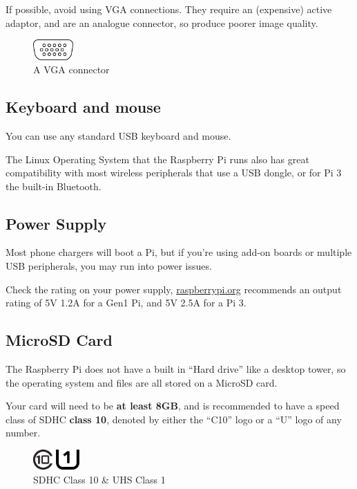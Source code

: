 		If possible, avoid using VGA connections. They require an (expensive) active adaptor, and are an analogue connector, so produce poorer image quality.
		
		\begin{figure}[h]
			\centering
			\includegraphics[height=22pt]{000_IntroToPi/1_EquipmentNeeded/VGA}
			\\A VGA connector
		\end{figure}

	\subsection*{Keyboard and mouse}
	
		You can use any standard USB keyboard and mouse.
		
		The Linux Operating System that the Raspberry Pi runs also has great compatibility with most wireless peripherals that use a USB dongle, or for Pi 3 the built-in Bluetooth.
		
	\subsection*{Power Supply}
	
		Most phone chargers will boot a Pi, but if you're using add-on boards or multiple USB peripherals, you may run into power issues.
		
		Check the rating on your power supply, \url{raspberrypi.org} recommends an output rating of 5V 1.2A for a Gen1 Pi, and 5V 2.5A for a Pi 3.
		
	\subsection*{MicroSD Card}
	
		The Raspberry Pi does not have a built in ``Hard drive'' like a desktop tower, so the operating system and files are all stored on a MicroSD card.
		
		Your card will need to be \textbf{at least 8GB}, and is recommended to have a speed class of SDHC \textbf{class 10}, denoted by either the ``C10'' logo or a ``U'' logo of any number.
	
		\begin{figure}[h]
			\centering
			\includegraphics[height=22pt]{000_IntroToPi/1_EquipmentNeeded/SDclass10}
			\hspace{12pt}
			\includegraphics[height=22pt]{000_IntroToPi/1_EquipmentNeeded/UHSclass}
			\\SDHC Class 10 \& UHS Class 1
		\end{figure}